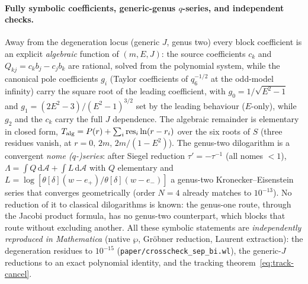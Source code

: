 \documentclass[12pt]{iopart}
\newcommand{\dd}{\mathrm{d}}
\theoremstyle{plain}
\theoremstyle{definition}
\theoremstyle{plain}
\theoremstyle{remark}
\begin{document}
\paragraph{Fully symbolic coefficients, generic-genus $q$-series, and independent checks.}
Away from the degeneration locus (generic $J$, genus two) every block coefficient is an
explicit \emph{algebraic} function of $(m,E,J)$: the source coefficients $c_k$ and
$Q_{kj}=c_kb_j-c_jb_k$ are rational, solved from the polynomial system, while the
canonical pole coefficients $g_i$ (Taylor coefficients of $q_6^{-1/2}$ at the odd-model
infinity) carry the square root of the leading coefficient, with
$g_0=1/\sqrt{E^2-1}$ and $g_1=(2E^2-3)/(E^2-1)^{3/2}$ set by the leading behaviour
($E$-only), while $g_2$ and the $c_k$ carry the full $J$ dependence. The
algebraic remainder is elementary in closed form,
$T_{\rm alg}=P(r)+\sum_i\mathrm{res}_i\ln(r-r_i)$ over the six roots of $S$
(three residues vanish, at $r=0,\,2m,\,2m/(1-E^2)$). The genus-two dilogarithm is a
convergent \emph{nome ($q$-)series}: after Siegel reduction $\tau'=-\tau^{-1}$ (all
nomes ${<}1$), $\Lambda=\int Q\,\dd\mathcal A+\int L\,\dd\mathcal A$ with $Q$
elementary and $L=\log[\theta[\delta](w-e_+)/\theta[\delta](w-e_-)]$ a genus-two
Kronecker--Eisenstein series that converges geometrically (order $N{=}4$ already
matches to $10^{-13}$). No reduction of it to classical dilogarithms is known: the
genus-one route, through the Jacobi product formula, has no genus-two counterpart,
which blocks that route without excluding another. All these symbolic statements are
\emph{independently reproduced in Mathematica} (native $\wp$, Gröbner reduction,
Laurent extraction): the degeneration residues to $10^{-15}$ (\texttt{paper/crosscheck\_sep\_bi.wl}), the generic-$J$
reductions to an exact polynomial identity, and the tracking
theorem~\eqref{eq:track-cancel}.
\end{document}

